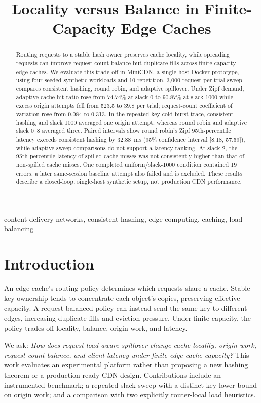\documentclass[conference]{IEEEtran}
\title{Locality versus Balance in Finite-Capacity Edge Caches}
\author{\IEEEauthorblockN{Author names to be finalized}
\IEEEauthorblockA{Affiliations and contact details to be supplied by the authors}}
\begin{document}
\maketitle

\begin{abstract}
Routing requests to a stable hash owner preserves cache locality, while
spreading requests can improve request-count balance but duplicate fills across
finite-capacity edge caches. We evaluate this trade-off in MiniCDN, a
single-host Docker prototype, using four seeded synthetic workloads and
10-repetition, 3,000-request-per-trial sweep compares consistent hashing,
round robin, and adaptive spillover. Under Zipf demand, adaptive cache-hit
ratio rose from 74.74\% at slack 0 to 90.87\% at slack 1000 while excess
origin attempts fell from 523.5 to 39.8 per trial; request-count coefficient
of variation rose from 0.084 to 0.313. In the repeated-key cold-burst trace,
consistent hashing and slack 1000 averaged one origin attempt, whereas round
robin and adaptive slack 0--8 averaged three. Paired intervals show round
robin's Zipf 95th-percentile latency exceeds consistent hashing by 32.88~ms
(95\% confidence interval [8.18, 57.59]), while adaptive-sweep comparisons
do not support a latency ranking. At slack 2, the 95th-percentile latency of
spilled cache misses was not consistently higher than that of non-spilled
cache misses. One completed uniform/slack-1000 condition contained 19 errors;
a later same-session baseline attempt also failed and is excluded. These
results describe a closed-loop, single-host synthetic setup, not production
CDN performance.
\end{abstract}

\begin{IEEEkeywords}
content delivery networks, consistent hashing, edge computing, caching,
load balancing
\end{IEEEkeywords}

\section{Introduction}
An edge cache's routing policy determines which requests share a cache.
Stable key ownership tends to concentrate each object's copies, preserving
effective capacity. A request-balanced policy can instead send the same key
to different edges, increasing duplicate fills and eviction pressure. Under
finite capacity, the policy trades off locality, balance, origin work, and
latency.

We ask: \emph{How does request-load-aware spillover change cache locality,
origin work, request-count balance, and client latency under finite edge-cache
capacity?} This work evaluates an experimental platform rather than proposing
a new hashing theorem or a production-ready CDN design. Contributions include
an instrumented benchmark; a repeated slack sweep with a distinct-key lower
bound on origin work; and a comparison with two explicitly router-local load
heuristics.
\end{document}
